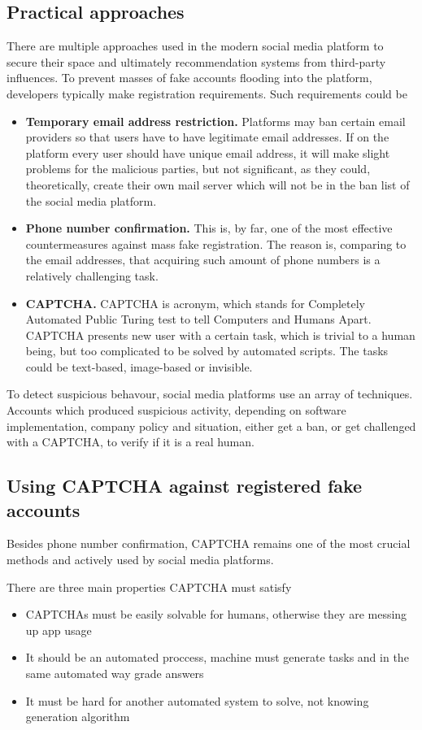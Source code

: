 \documentclass[10pt,twocolumn,twoside,a4paper]{article} %
\begin{document}
\subsection{Practical approaches}
There are multiple approaches used in the modern social media platform to secure their space and ultimately recommendation systems from third-party influences.
To prevent masses of fake accounts flooding into the platform, developers typically make registration requirements. Such requirements could be
\begin{itemize}
    \item \textbf{Temporary email address restriction.} Platforms may ban certain email providers so that users have to have legitimate email addresses. If on the platform every user should have unique email address, it will make slight problems for the malicious parties, but not significant, as they could, theoretically, create their own mail server which will not be in the ban list of the social media platform.
    \item \textbf{Phone number confirmation.} This is, by far, one of the most effective countermeasures against mass fake registration. The reason is, comparing to the email addresses, that acquiring such amount of phone numbers is a relatively challenging task.
    \item \textbf{CAPTCHA.} CAPTCHA is acronym, which stands for Completely Automated Public Turing test to tell Computers and Humans Apart. \cite{singh2014survey} CAPTCHA presents new user with a certain task, which is trivial to a human being, but too complicated to be solved by automated scripts. The tasks could be text-based, image-based or invisible.
\end{itemize}

To detect suspicious behavour, social media platforms use an array of techniques. Accounts which produced suspicious activity, depending on software implementation, company policy and situation, either get a ban, or get challenged with a CAPTCHA, to verify if it is a real human.

\subsection{Using CAPTCHA against registered fake accounts}
Besides phone number confirmation, CAPTCHA remains one of the most crucial methods and actively used by social media platforms.

There are three main properties \cite{singh2014survey} CAPTCHA must satisfy
\begin{itemize}
    \item CAPTCHAs must be easily solvable for humans, otherwise they are messing up app usage
    \item It should be an automated proccess, machine must generate tasks and in the same automated way grade answers
    \item It must be hard for another automated system to solve, not knowing generation algorithm
\end{itemize}
\end{document}
